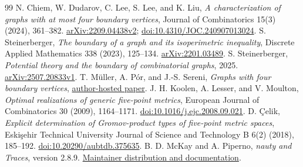 \documentclass[11pt,a4paper]{article}
\theoremstyle{definition}\newtheorem{definition}[theorem]{Definition}
\theoremstyle{remark}\newtheorem{remark}[theorem]{Remark}
\begin{document}
\clearpage
\begingroup\small\setlength{\parskip}{0pt}
\begin{thebibliography}{99}\setlength{\itemsep}{2pt}
N. Chiem, W. Dudarov, C. Lee, S. Lee, and K. Liu,
\emph{A characterization of graphs with at most four boundary vertices},
Journal of Combinatorics 15(3) (2024), 361--382.
\href{https://arxiv.org/abs/2209.04438}{arXiv:2209.04438v2};
\href{https://doi.org/10.4310/JOC.240907013024}{doi:10.4310/JOC.240907013024}.
S. Steinerberger, \emph{The boundary of a graph and its isoperimetric inequality},
Discrete Applied Mathematics 338 (2023), 125--134.
\href{https://arxiv.org/abs/2201.03489}{arXiv:2201.03489}.
S. Steinerberger, \emph{Potential theory and the boundary of combinatorial graphs},
2025. \href{https://arxiv.org/abs/2507.20833}{arXiv:2507.20833v1}.
T. M\"uller, A. P\'or, and J.-S. Sereni,
\emph{Graphs with four boundary vertices},
\href{https://www.math.rug.nl/~tobias/Papers/boundary4.pdf}{author-hosted paper}.
J. H. Koolen, A. Lesser, and V. Moulton,
\emph{Optimal realizations of generic five-point metrics},
European Journal of Combinatorics 30 (2009), 1164--1171.
\href{https://doi.org/10.1016/j.ejc.2008.09.021}{doi:10.1016/j.ejc.2008.09.021}.
D. \c{C}elik, \emph{Explicit determination of Gromov-product types of
five-point metric spaces}, Eski\c{s}ehir Technical University Journal of
Science and Technology B 6(2) (2018), 185--192.
\href{https://doi.org/10.20290/aubtdb.375635}{doi:10.20290/aubtdb.375635}.
B. D. McKay and A. Piperno, \emph{nauty and Traces}, version 2.8.9.
\href{https://users.cecs.anu.edu.au/~bdm/nauty/}{Maintainer distribution and documentation}.
\end{thebibliography}
\endgroup
\end{document}
